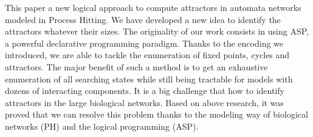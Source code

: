 This paper a new logical approach to compute attractors in automata networks modeled in Process Hitting. We have developed a new idea to identify the attractors whatever their sizes. The originality of our work consists in using ASP, a powerful declarative programming paradigm. Thanks to the encoding we introduced, we are able to tackle the enumeration of fixed points, cycles and attractors. The major benefit of such a method is to get an exhaustive enumeration of all searching states while still being tractable for models with dozens of interacting components. It is a big challenge that how to identify attractors in the large biological networks. Based on above research, it was proved that we can resolve this problem thanks to the modeling way of biological networks (PH) and the logical programming (ASP).


%
